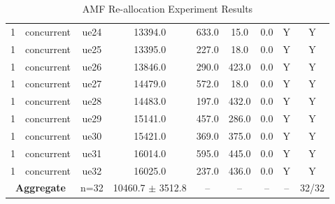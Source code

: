 \begin{table}[ht]
\begin{tabular}{|c|c|c|c|c|c|c|c|c|}
1 & concurrent & ue24 & 13394.0 & 633.0 & 15.0 & 0.0 & Y & Y \\
1 & concurrent & ue25 & 13395.0 & 227.0 & 18.0 & 0.0 & Y & Y \\
1 & concurrent & ue26 & 13846.0 & 290.0 & 423.0 & 0.0 & Y & Y \\
1 & concurrent & ue27 & 14479.0 & 572.0 & 18.0 & 0.0 & Y & Y \\
1 & concurrent & ue28 & 14483.0 & 197.0 & 432.0 & 0.0 & Y & Y \\
1 & concurrent & ue29 & 15141.0 & 457.0 & 286.0 & 0.0 & Y & Y \\
1 & concurrent & ue30 & 15421.0 & 369.0 & 375.0 & 0.0 & Y & Y \\
1 & concurrent & ue31 & 16014.0 & 595.0 & 445.0 & 0.0 & Y & Y \\
1 & concurrent & ue32 & 16025.0 & 237.0 & 436.0 & 0.0 & Y & Y \\
\multicolumn{2}{|c|}{\textbf{Aggregate}} & n=32 & 10460.7 $\pm$ 3512.8 & -- & -- & -- & -- & 32/32 \\
\hline
\end{tabular}
\caption{AMF Re-allocation Experiment Results}
\label{tab:amf_realloc}
\end{table}
